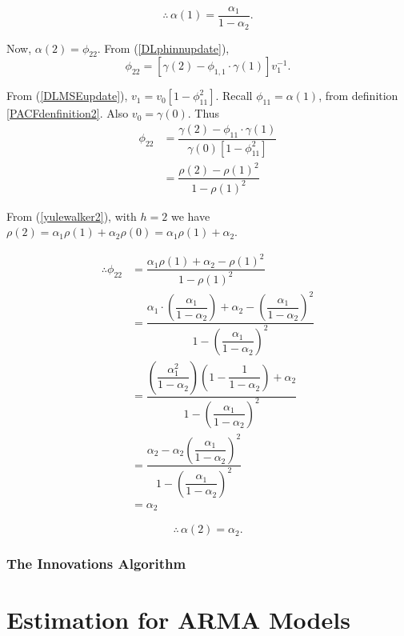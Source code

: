 \documentclass[11pt, a4paper]{article}
\numberwithin{equation}{section}
\theoremstyle{definition}
\begin{document}
$$\therefore \, \alpha(1) = \dfrac{\alpha_1}{1 - \alpha_2}.$$

Now, $\alpha(2) = \phi_{22}$. From (\ref{DLphinnupdate}),
$$\phi_{22} = \left[ \gamma(2) - \phi_{1, 1} \cdot \gamma(1) \right] v_{1}^{-1}.$$

From (\ref{DLMSEupdate}), $v_1 = v_{0} \left[ 1 - \phi_{11}^2 \right]$. Recall $\phi_{11} = \alpha(1)$, from definition \ref{PACFdenfinition2}. Also $v_0 = \gamma(0)$. Thus
\begin{align*}
\phi_{22} &= \dfrac{\gamma(2) - \phi_{11} \cdot \gamma(1)}{\gamma(0) \left[ 1 - \phi_{11}^2 \right]} \\[0.2em]
&= \dfrac{\rho(2) - \rho(1)^2}{1 - \rho(1)^2}
\end{align*}

From (\ref{yulewalker2}), with $h = 2$ we have $\rho(2) = \alpha_1 \rho(1) + \alpha_2 \rho(0) = \alpha_1 \rho(1) + \alpha_2$.

\begin{align*}
\therefore \phi_{22} &= \dfrac{\alpha_1 \rho(1) + \alpha_2 - \rho(1)^2}{1 - \rho(1)^2} \\[0.2em]
&= \dfrac{\alpha_1 \cdot \left( \dfrac{\alpha_1}{1 - \alpha_2} \right) + \alpha_2 - \left( \dfrac{\alpha_1}{1 - \alpha_2} \right)^2}{1 - \left( \dfrac{\alpha_1}{1 - \alpha_2} \right)^2} \\[0.2em]
&= \dfrac{\left( \dfrac{\alpha_1^2}{1 - \alpha_2} \right)\left( 1 -  \dfrac{1}{1 - \alpha_2} \right) + \alpha_2}{1 - \left( \dfrac{\alpha_1}{1 - \alpha_2} \right)^2} \\[0.2em]
&= \dfrac{\alpha_2 - \alpha_2 \left( \dfrac{\alpha_1}{1 - \alpha_2} \right)^2}{1 - \left( \dfrac{\alpha_1}{1 - \alpha_2} \right)^2} \\[0.2em]
&= \alpha_2
\end{align*}

$$\therefore \, \alpha(2) = \alpha_2.$$

\subsubsection{The Innovations Algorithm}

\section{Estimation for ARMA Models}
\end{document}
